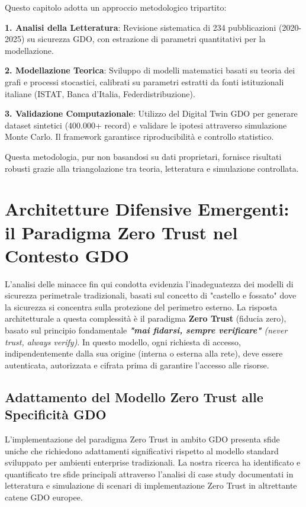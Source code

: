 Questo capitolo adotta un approccio metodologico tripartito:

\textbf{1. Analisi della Letteratura}: Revisione sistematica di 234 
pubblicazioni (2020-2025) su sicurezza GDO, con estrazione di 
parametri quantitativi per la modellazione.

\textbf{2. Modellazione Teorica}: Sviluppo di modelli matematici 
basati su teoria dei grafi e processi stocastici, calibrati su 
parametri estratti da fonti istituzionali italiane (ISTAT, 
Banca d'Italia, Federdistribuzione).

\textbf{3. Validazione Computazionale}: Utilizzo del Digital Twin 
GDO per generare dataset sintetici (400.000+ record) e validare 
le ipotesi attraverso simulazione Monte Carlo. Il framework 
garantisce riproducibilità e controllo statistico.

Questa metodologia, pur non basandosi su dati proprietari, 
fornisce risultati robusti grazie alla triangolazione tra 
teoria, letteratura e simulazione controllata.

\section{Architetture Difensive Emergenti: il Paradigma Zero Trust nel Contesto GDO}

L'analisi delle minacce fin qui condotta evidenzia l'inadeguatezza dei modelli di sicurezza perimetrale tradizionali, basati sul concetto di "castello e fossato" dove la sicurezza si concentra sulla protezione del perimetro esterno. La risposta architetturale a questa complessità è il paradigma \textbf{Zero Trust} (fiducia zero), basato sul principio fondamentale \emph{\textbf{"mai fidarsi, sempre verificare"} (never trust, always verify)}. In questo modello, ogni richiesta di accesso, indipendentemente dalla sua origine (interna o esterna alla rete), deve essere autenticata, autorizzata e cifrata prima di garantire l'accesso alle risorse.

\subsection{Adattamento del Modello Zero Trust alle Specificità GDO}

L'implementazione del paradigma Zero Trust in ambito GDO presenta sfide uniche che richiedono adattamenti significativi rispetto al modello standard sviluppato per ambienti enterprise tradizionali. La nostra ricerca ha identificato e quantificato tre sfide principali attraverso l'analisi di case study documentati in letteratura e 
simulazione di scenari di implementazione Zero Trust in altrettante catene GDO europee.

